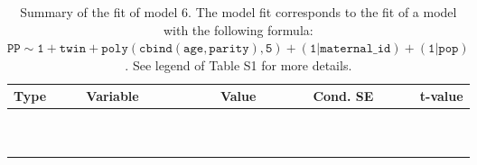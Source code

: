 \begin{table}

\caption{\label{tab:tab6}Summary of the fit of model 6. The model fit corresponds to the fit of a model with the following formula: {\small$\mathtt{PP \sim 1 + twin + poly(cbind(age, parity), 5) + (1 | maternal\_id) + (1 | pop)}$}. See legend of Table S1 for more details.}
\centering
\fontsize{8}{10}\selectfont
\begin{tabular}[t]{>{\raggedright\arraybackslash}p{3cm}>{\raggedright\arraybackslash}p{5cm}rrr}
\toprule
Type & Variable & Value & Cond. SE & t-value\\
\midrule
\cellcolor{gray!6}{fixed effects} & \cellcolor{gray!6}{$\beta_1$} & \cellcolor{gray!6}{1.57} & \cellcolor{gray!6}{0.179} & \cellcolor{gray!6}{8.74}\\
\cellcolor{gray!6}{} & \cellcolor{gray!6}{$\beta_{\mathtt{twin}}$} & \cellcolor{gray!6}{-0.412} & \cellcolor{gray!6}{0.0636} & \cellcolor{gray!6}{-6.47}\\
\cellcolor{gray!6}{} & \cellcolor{gray!6}{$\beta_{\mathtt{age}}$} & \cellcolor{gray!6}{-420} & \cellcolor{gray!6}{59.7} & \cellcolor{gray!6}{-7.04}\\
\cellcolor{gray!6}{} & \cellcolor{gray!6}{$\beta_{\mathtt{age}^2}$} & \cellcolor{gray!6}{-185} & \cellcolor{gray!6}{51.7} & \cellcolor{gray!6}{-3.57}\\
\cellcolor{gray!6}{} & \cellcolor{gray!6}{$\beta_{\mathtt{age}^3}$} & \cellcolor{gray!6}{-43.7} & \cellcolor{gray!6}{32.6} & \cellcolor{gray!6}{-1.34}\\
\cellcolor{gray!6}{} & \cellcolor{gray!6}{$\beta_{\mathtt{age}^4}$} & \cellcolor{gray!6}{-15.7} & \cellcolor{gray!6}{14.3} & \cellcolor{gray!6}{-1.09}\\
\cellcolor{gray!6}{} & \cellcolor{gray!6}{$\beta_{\mathtt{age}^5}$} & \cellcolor{gray!6}{2.47} & \cellcolor{gray!6}{9.7} & \cellcolor{gray!6}{0.255}\\
\cellcolor{gray!6}{} & \cellcolor{gray!6}{$\beta_{\mathtt{parity}}$} & \cellcolor{gray!6}{49.1} & \cellcolor{gray!6}{97.6} & \cellcolor{gray!6}{0.502}\\
\cellcolor{gray!6}{} & \cellcolor{gray!6}{$\beta_{\mathtt{age}\times\mathtt{parity}}$} & \cellcolor{gray!6}{12922} & \cellcolor{gray!6}{39528} & \cellcolor{gray!6}{0.327}\\
\cellcolor{gray!6}{} & \cellcolor{gray!6}{$\beta_{\mathtt{age}^2\times\mathtt{parity}}$} & \cellcolor{gray!6}{-33721} & \cellcolor{gray!6}{30550} & \cellcolor{gray!6}{-1.1}\\

\end{tabular}
\end{table}
